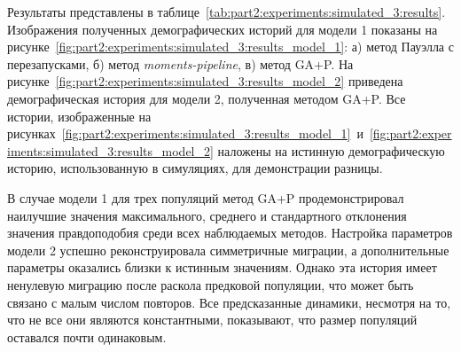 Результаты представлены в таблице~\ref{tab:part2:experiments:simulated_3:results}. Изображения полученных демографических историй для модели 1 показаны на рисунке~\ref{fig:part2:experiments:simulated_3:results_model_1}: а) метод Пауэлла с перезапусками, б) метод \textit{moments-pipeline}, в) метод GA+P.
На рисунке~\ref{fig:part2:experiments:simulated_3:results_model_2} приведена демографическая история для модели 2, полученная методом GA+P.
Все истории, изображенные на рисунках~\ref{fig:part2:experiments:simulated_3:results_model_1}~и~\ref{fig:part2:experiments:simulated_3:results_model_2} наложены на истинную демографическую историю, использованную в симуляциях, для демонстрации разницы.

В случае модели 1 для трех популяций метод GA+P продемонстрировал наилучшие значения максимального, среднего и стандартного отклонения значения правдоподобия среди всех наблюдаемых методов.
Настройка параметров модели 2 успешно реконструировала симметричные миграции, а дополнительные параметры оказались близки к истинным значениям.
Однако эта история имеет ненулевую миграцию после раскола предковой популяции, что может быть связано с малым числом повторов.
Все предсказанные динамики, несмотря на то, что не все они являются константными, показывают, что размер популяций оставался почти одинаковым.


